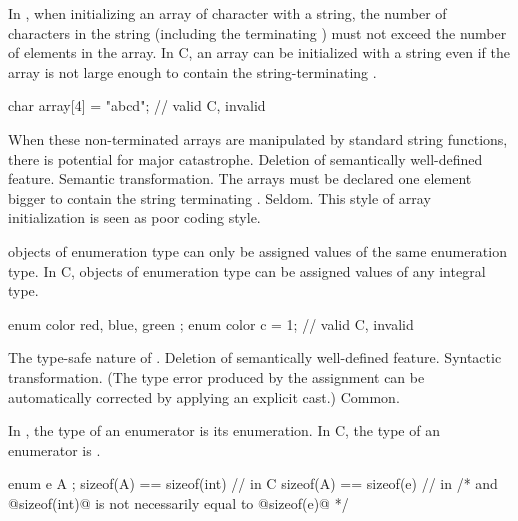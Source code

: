 \change
In \Cpp{}, when initializing an array of character with a string, the number of
characters in the string (including the terminating ) must not exceed the
number of elements in the array. In C, an array can be initialized with a string even if
the array is not large enough to contain the string-terminating .

\begin{example}
\begin{codeblock}
char array[4] = "abcd";         // valid C, invalid \Cpp{}
\end{codeblock}
\end{example}
\rationale
When these non-terminated arrays are manipulated by standard
string functions, there is potential for major catastrophe.
\effect
Deletion of semantically well-defined feature.
\difficulty
Semantic transformation.
The arrays must be declared one element bigger to contain the
string terminating .
\howwide
Seldom.
This style of array initialization is seen as poor coding style.

\change
\Cpp{} objects of enumeration type can only be assigned values of the same enumeration type.
In C, objects of enumeration type can be assigned values of any integral type.

\begin{example}
\begin{codeblock}
enum color { red, blue, green };
enum color c = 1;               // valid C, invalid \Cpp{}
\end{codeblock}
\end{example}

\rationale
The type-safe nature of \Cpp{}.
\effect
Deletion of semantically well-defined feature.
\difficulty
Syntactic transformation.
(The type error produced by the assignment can be automatically
corrected by applying an explicit cast.)
\howwide
Common.

\change
In \Cpp{}, the type of an enumerator is its enumeration. In C, the type of an enumerator is .

\begin{example}
\begin{codeblock}
enum e { A };
sizeof(A) == sizeof(int)        // in C
sizeof(A) == sizeof(e)          // in \Cpp{}
/* and @sizeof(int)@ is not necessarily equal to @sizeof(e)@ */
\end{codeblock}
\end{example}

